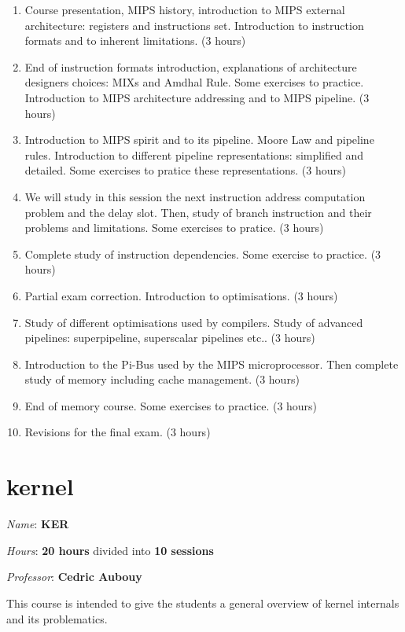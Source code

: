 {\begin{multicols}{2}
\begin{enumerate}
  \item
    Course presentation, MIPS history, introduction to MIPS external
    architecture: registers and instructions set. Introduction to
    instruction formats and to inherent limitations. (3 hours)
  \item
    End of instruction formats introduction, explanations of architecture
    designers choices: MIXs and Amdhal Rule. Some exercises to practice.
    Introduction to MIPS architecture addressing and to MIPS pipeline.
    (3 hours)
  \item
    Introduction to MIPS spirit and to its pipeline. Moore Law and
    pipeline rules. Introduction to different pipeline representations:
    simplified and detailed. Some exercises to pratice these representations.
    (3 hours)
  \item
    We will study in this session the next instruction address computation
    problem and the delay slot. Then, study of branch instruction and their
    problems and limitations. Some exercises to pratice. (3 hours)
  \item
    Complete study of instruction dependencies. Some exercise to practice.
    (3 hours)
  \item
    Partial exam correction. Introduction to optimisations. (3 hours)
  \item
    Study of different optimisations used by compilers. Study of
    advanced pipelines: superpipeline, superscalar pipelines etc.. (3 hours)
  \item
    Introduction to the Pi-Bus used by the MIPS microprocessor. Then complete
    study of memory including cache management. (3 hours)
  \item
    End of memory course. Some exercises to practice. (3 hours)
  \item
    Revisions for the final exam. (3 hours)
\end{enumerate}

%
%

\section{kernel}

\textit{Name}: \textbf{KER}

\textit{Hours}: \textbf{20 hours} divided into \textbf{10 sessions}

\textit{Professor}: \textbf{Cedric Aubouy}

This course is intended to give the students a general overview of
kernel internals and its problematics.


\end{multicols}}
